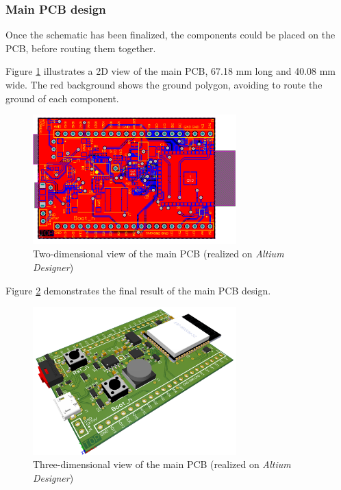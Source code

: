 \subsubsection{Main PCB design}
\label{subsubsec:main_pcb/design} 

Once the schematic has been finalized, the components could be placed on the PCB, before routing them together.

\medskip Figure \ref{fig:PCB_2D} illustrates a 2D view of the main PCB, 67.18 mm long and 40.08 mm wide. The red background shows the ground polygon, avoiding to route the ground of each component.

\begin{figure}[H]
    \centering
    \includegraphics[width=0.7\textwidth]{images/EE_PCB_2D.PNG}
    \caption{Two-dimensional view of the main PCB (realized on \textit{Altium Designer})}
    \label{fig:PCB_2D}
\end{figure}

Figure \ref{fig:PCB_3D} demonstrates the final result of the main PCB design.

\begin{figure}[H]
    \centering
    \includegraphics[width=0.7\textwidth]{images/EE_PCB_3D.PNG}
    \caption{Three-dimensional view of the main PCB (realized on \textit{Altium Designer})}
    \label{fig:PCB_3D}
\end{figure}
